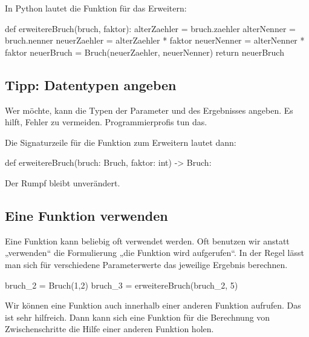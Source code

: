 In Python lautet die Funktion für das Erweitern:
\begin{codePython}
def erweitereBruch(bruch, faktor):
	alterZaehler = bruch.zaehler
	alterNenner = bruch.nenner
	neuerZaehler = alterZaehler * faktor
	neuerNenner = alterNenner * faktor
	neuerBruch = Bruch(neuerZaehler, neuerNenner)
	return neuerBruch
\end{codePython}

\subsection{Tipp: Datentypen angeben}

Wer möchte, kann die Typen der Parameter und des Ergebnisses angeben. Es hilft, Fehler zu vermeiden. Programmierprofis tun das.

Die Signaturzeile für die Funktion zum Erweitern lautet dann:

\begin{codePython}
def erweitereBruch(bruch: Bruch, faktor: int) -> Bruch:
\end{codePython}

Der Rumpf bleibt unverändert.

\subsection{Eine Funktion verwenden}

Eine Funktion kann beliebig oft verwendet werden. Oft benutzen wir anstatt „verwenden“ die Formulierung „die Funktion wird aufgerufen“. In der Regel lässt man sich für verschiedene Parameterwerte das jeweilige Ergebnis berechnen.

\begin{codePython}
bruch_2 = Bruch(1,2)
bruch_3 = erweitereBruch(bruch_2, 5)
\end{codePython}

Wir können eine Funktion auch innerhalb einer anderen Funktion aufrufen. Das ist sehr hilfreich. Dann kann sich eine Funktion für die Berechnung von Zwischenschritte die Hilfe einer anderen Funktion holen.

